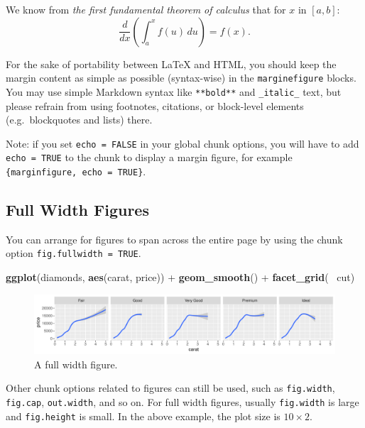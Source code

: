 \documentclass[]{tufte-handout}
\newenvironment{Shaded}{}{}
\newcommand{\KeywordTok}[1]{\textcolor[rgb]{0.00,0.44,0.13}{\textbf{#1}}}
\newcommand{\StringTok}[1]{\textcolor[rgb]{0.25,0.44,0.63}{#1}}
\newcommand{\OperatorTok}[1]{\textcolor[rgb]{0.40,0.40,0.40}{#1}}
\newcommand{\NormalTok}[1]{#1}
\begin{document}
\begin{marginfigure}
We know from \emph{the first fundamental theorem of calculus} that for
\(x\) in \([a, b]\):
\[\frac{d}{dx}\left( \int_{a}^{x} f(u)\,du\right)=f(x).\]
\end{marginfigure}

For the sake of portability between LaTeX and HTML, you should keep the
margin content as simple as possible (syntax-wise) in the
\texttt{marginefigure} blocks. You may use simple Markdown syntax like
\texttt{**bold**} and \texttt{\_italic\_} text, but please refrain from
using footnotes, citations, or block-level elements (e.g.~blockquotes
and lists) there.

Note: if you set \texttt{echo\ =\ FALSE} in your global chunk options,
you will have to add \texttt{echo\ =\ TRUE} to the chunk to display a
margin figure, for example
\texttt{\textasciigrave{}\textasciigrave{}\textasciigrave{}\{marginfigure,\ echo\ =\ TRUE\}}.

\subsection{Full Width Figures}\label{full-width-figures}

You can arrange for figures to span across the entire page by using the
chunk option \texttt{fig.fullwidth\ =\ TRUE}.

\begin{Shaded}
\begin{Highlighting}[]
\KeywordTok{ggplot}\NormalTok{(diamonds, }\KeywordTok{aes}\NormalTok{(carat, price)) }\OperatorTok{+}\StringTok{ }\KeywordTok{geom_smooth}\NormalTok{() }\OperatorTok{+}
\StringTok{  }\KeywordTok{facet_grid}\NormalTok{(}\OperatorTok{~}\StringTok{ }\NormalTok{cut)}
\end{Highlighting}
\end{Shaded}

\begin{figure}
\includegraphics{TufteExample_files/figure-latex/fig-fullwidth-1} \caption[A full width figure]{A full width figure.}\label{fig:fig-fullwidth}
\end{figure}

Other chunk options related to figures can still be used, such as
\texttt{fig.width}, \texttt{fig.cap}, \texttt{out.width}, and so on. For
full width figures, usually \texttt{fig.width} is large and
\texttt{fig.height} is small. In the above example, the plot size is
\(10 \times 2\).
\end{document}
